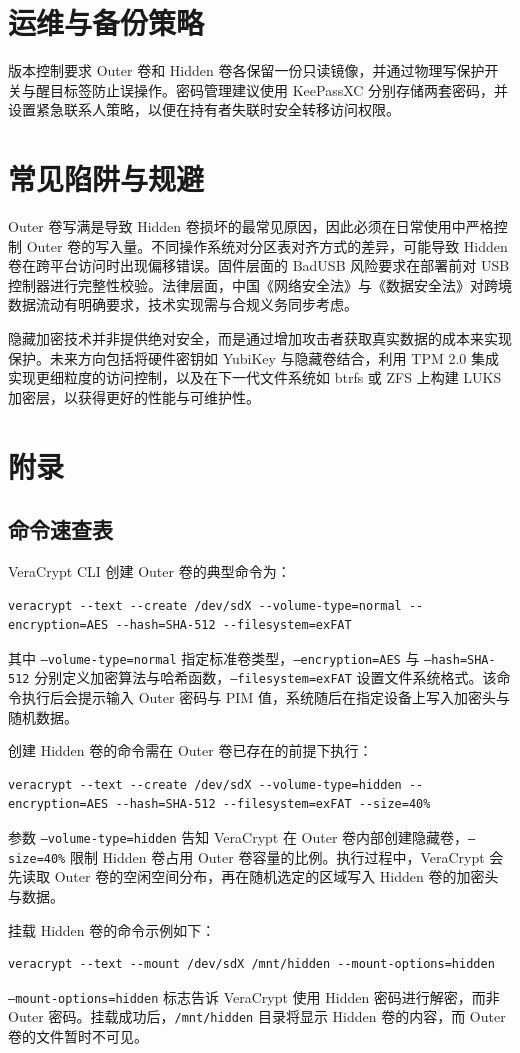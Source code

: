 \chapter{运维与备份策略}
版本控制要求 Outer 卷和 Hidden 卷各保留一份只读镜像，并通过物理写保护开关与醒目标签防止误操作。密码管理建议使用 KeePassXC 分别存储两套密码，并设置紧急联系人策略，以便在持有者失联时安全转移访问权限。\par
\chapter{常见陷阱与规避}
Outer 卷写满是导致 Hidden 卷损坏的最常见原因，因此必须在日常使用中严格控制 Outer 卷的写入量。不同操作系统对分区表对齐方式的差异，可能导致 Hidden 卷在跨平台访问时出现偏移错误。固件层面的 BadUSB 风险要求在部署前对 USB 控制器进行完整性校验。法律层面，中国《网络安全法》与《数据安全法》对跨境数据流动有明确要求，技术实现需与合规义务同步考虑。\par
隐藏加密技术并非提供绝对安全，而是通过增加攻击者获取真实数据的成本来实现保护。未来方向包括将硬件密钥如 YubiKey 与隐藏卷结合，利用 TPM 2.0 集成实现更细粒度的访问控制，以及在下一代文件系统如 btrfs 或 ZFS 上构建 LUKS 加密层，以获得更好的性能与可维护性。\par
\chapter{附录}
\section{命令速查表}
VeraCrypt CLI 创建 Outer 卷的典型命令为：\par
\begin{lstlisting}
veracrypt --text --create /dev/sdX --volume-type=normal --encryption=AES --hash=SHA-512 --filesystem=exFAT
\end{lstlisting}
其中 \texttt{--volume-type=normal} 指定标准卷类型，\texttt{--encryption=AES} 与 \texttt{--hash=SHA-512} 分别定义加密算法与哈希函数，\texttt{--filesystem=exFAT} 设置文件系统格式。该命令执行后会提示输入 Outer 密码与 PIM 值，系统随后在指定设备上写入加密头与随机数据。\par
创建 Hidden 卷的命令需在 Outer 卷已存在的前提下执行：\par
\begin{lstlisting}
veracrypt --text --create /dev/sdX --volume-type=hidden --encryption=AES --hash=SHA-512 --filesystem=exFAT --size=40%
\end{lstlisting}
参数 \texttt{--volume-type=hidden} 告知 VeraCrypt 在 Outer 卷内部创建隐藏卷，\texttt{--size=40\%{}} 限制 Hidden 卷占用 Outer 卷容量的比例。执行过程中，VeraCrypt 会先读取 Outer 卷的空闲空间分布，再在随机选定的区域写入 Hidden 卷的加密头与数据。\par
挂载 Hidden 卷的命令示例如下：\par
\begin{lstlisting}
veracrypt --text --mount /dev/sdX /mnt/hidden --mount-options=hidden
\end{lstlisting}
\texttt{--mount-options=hidden} 标志告诉 VeraCrypt 使用 Hidden 密码进行解密，而非 Outer 密码。挂载成功后，\texttt{/mnt/hidden} 目录将显示 Hidden 卷的内容，而 Outer 卷的文件暂时不可见。\par
